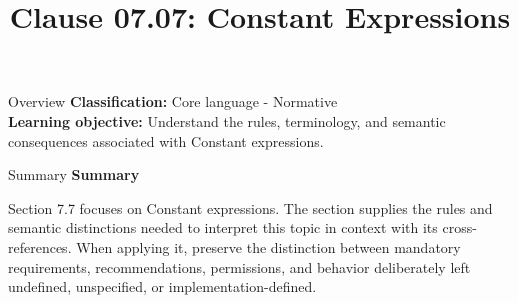 \documentclass[10pt,letterpaper]{article}
\title{Clause 07.07: Constant Expressions}
\author{}
\date{}
\begin{document}
\maketitle
\begin{CornellOverviewBox}{Overview}
\textbf{Classification:} Core language - Normative\\[2pt]
\textbf{Learning objective:} Understand the rules, terminology, and semantic consequences associated with Constant expressions.
\end{CornellOverviewBox}\begin{CornellSummaryBox}{Summary}
{\sffamily\bfseries\color{Accent} Summary}\par\vspace{3pt}Section 7.7 focuses on Constant expressions. The section supplies the rules and semantic distinctions needed to interpret this topic in context with its cross-references. When applying it, preserve the distinction between mandatory requirements, recommendations, permissions, and behavior deliberately left undefined, unspecified, or implementation-defined.
\end{CornellSummaryBox}
\end{document}
